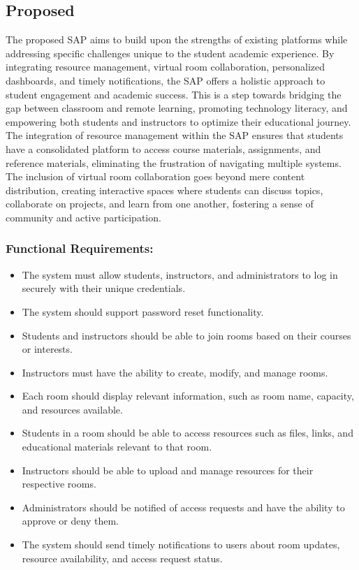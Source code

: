  \subsection{Proposed}
 The proposed SAP aims to build upon the strengths of existing platforms while addressing specific challenges unique to the student academic experience. By integrating resource management, virtual room collaboration, personalized dashboards, and timely notifications, the SAP offers a holistic approach to student engagement and academic success. This is a step towards bridging the gap between classroom and remote learning, promoting technology literacy, and empowering both students and instructors to optimize their educational journey.\\
 The integration of resource management within the SAP ensures that students have a consolidated platform to access course materials, assignments, and reference materials, eliminating the frustration of navigating multiple systems. The inclusion of virtual room collaboration goes beyond mere content distribution, creating interactive spaces where students can discuss topics, collaborate on projects, and learn from one another, fostering a sense of community and active participation.

 \subsubsection{Functional Requirements:}
    \begin{itemize}
        \item The system must allow students, instructors, and administrators to log in securely with their unique credentials.
        \item The system should support password reset functionality.
        \item Students and instructors should be able to join rooms based on their courses or interests.
        \item Instructors must have the ability to create, modify, and manage rooms.
        \item Each room should display relevant information, such as room name, capacity, and resources available.
        \item Students in a room should be able to access resources such as files, links, and educational materials relevant to that room.
        \item Instructors should be able to upload and manage resources for their respective rooms.
        \item Administrators should be notified of access requests and have the ability to approve or deny them.
        \item The system should send timely notifications to users about room updates, resource availability, and access request status.
    \end{itemize}

